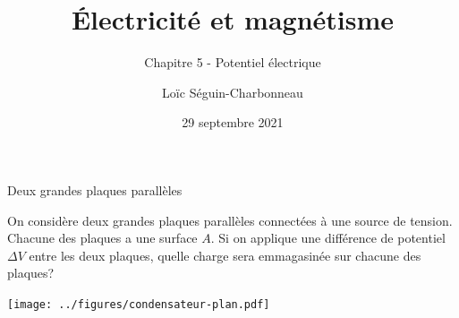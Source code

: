 \documentclass{beamer}
\title{Électricité et magnétisme}
\subtitle{Chapitre 5 - Potentiel électrique}
\date{29 septembre 2021}
\author{Loïc Séguin-Charbonneau}
\institute{Cégep Édouard-Montpetit}
\begin{document}
\maketitle


\begin{frame}{Deux grandes plaques parallèles}

On considère deux grandes plaques parallèles connectées à une source de
tension. Chacune des plaques a une surface $A$. Si on applique une différence
de potentiel $\Delta V$ entre les deux plaques, quelle charge sera emmagasinée
sur chacune des plaques?

\begin{center}
  \texttt{[image: ../figures/condensateur-plan.pdf]}
\end{center}

\end{frame}
\end{document}
